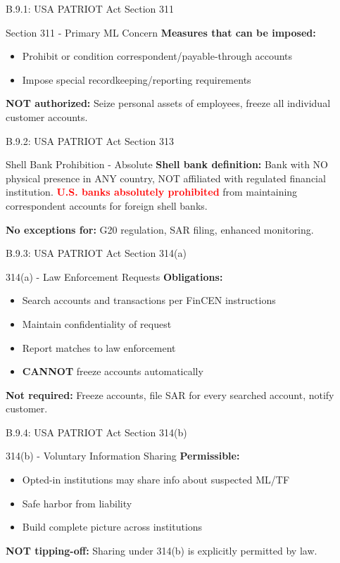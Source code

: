 \documentclass{beamer}
\begin{document}
	\begin{frame}{B.9.1: USA PATRIOT Act Section 311}
		\begin{block}{Section 311 - Primary ML Concern}
			\textbf{Measures that can be imposed:}
			\begin{itemize}
				\item Prohibit or condition correspondent/payable-through accounts
				\item Impose special recordkeeping/reporting requirements
			\end{itemize}
		\end{block}
		\textbf{NOT authorized:} Seize personal assets of employees, freeze all individual customer accounts.
	\end{frame}
	
	\begin{frame}{B.9.2: USA PATRIOT Act Section 313}
		\begin{block}{Shell Bank Prohibition - Absolute}
			\textbf{Shell bank definition:} Bank with NO physical presence in ANY country, NOT affiliated with regulated financial institution.
			\vspace{0.2cm}
			\textcolor{red}{\textbf{U.S. banks absolutely prohibited}} from maintaining correspondent accounts for foreign shell banks.
		\end{block}
		\textbf{No exceptions for:} G20 regulation, SAR filing, enhanced monitoring.
	\end{frame}
	
	\begin{frame}{B.9.3: USA PATRIOT Act Section 314(a)}
		\begin{block}{314(a) - Law Enforcement Requests}
			\textbf{Obligations:}
			\begin{itemize}
				\item Search accounts and transactions per FinCEN instructions
				\item Maintain confidentiality of request
				\item Report matches to law enforcement
				\item \textbf{CANNOT} freeze accounts automatically
			\end{itemize}
		\end{block}
		\textbf{Not required:} Freeze accounts, file SAR for every searched account, notify customer.
	\end{frame}
	
	\begin{frame}{B.9.4: USA PATRIOT Act Section 314(b)}
		\begin{block}{314(b) - Voluntary Information Sharing}
			\textbf{Permissible:}
			\begin{itemize}
				\item Opted-in institutions may share info about suspected ML/TF
				\item Safe harbor from liability
				\item Build complete picture across institutions
			\end{itemize}
		\end{block}
		\textbf{NOT tipping-off:} Sharing under 314(b) is explicitly permitted by law.
	\end{frame}
	
\end{document}

